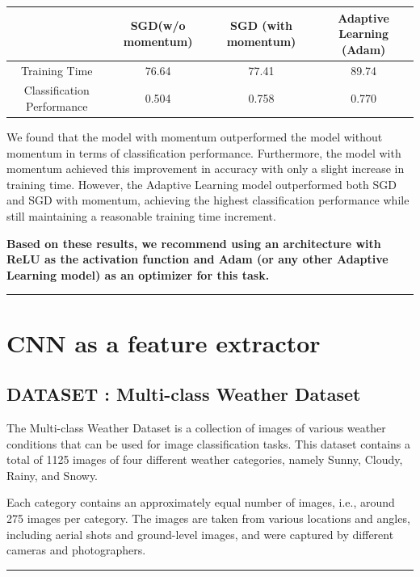\documentclass[a4paper]{article}
\begin{document}
\begin{table}[H]
\centering
\begin{tabular}{||c | c | c | c ||} 
 \hline
   & SGD(w/o momentum) & SGD (with momentum) & Adaptive Learning (Adam)\\ [0.5ex] 
 \hline\hline
 Training Time & 76.64 & 77.41 & 89.74 \\ 
 Classification Performance & 0.504 & 0.758 & 0.770\\[1ex] 
 \hline
\end{tabular}
\label{table:1}
\end{table}

We found that the model with momentum outperformed the model without momentum in terms of classification performance. Furthermore, the model with momentum achieved this improvement in accuracy with only a slight increase in training time. However, the Adaptive Learning model outperformed both SGD and SGD with momentum, achieving the highest classification performance while still maintaining a reasonable training time increment.

\textbf{Based on these results, we recommend using an architecture with ReLU as the activation function and Adam (or any other Adaptive Learning model) as an optimizer for this task.}


\par\noindent\rule{\textwidth}{0.4pt}
\pagebreak
\section{CNN as a feature extractor}
\subsection{DATASET : Multi-class Weather Dataset}
The Multi-class Weather Dataset is a collection of images of various weather conditions that can be used for image classification tasks. This dataset contains a total of 1125 images of four different weather categories, namely Sunny, Cloudy, Rainy, and Snowy.

Each category contains an approximately equal number of images, i.e., around 275 images per category. The images are taken from various locations and angles, including aerial shots and ground-level images, and were captured by different cameras and photographers.
\par\noindent\rule{\textwidth}{0.4pt}
\pagebreak
\end{document}

